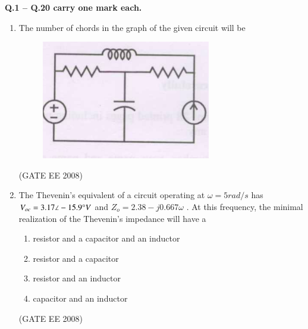\documentclass[journal,12pt,onecolumn]{IEEEtran}
\theoremstyle{remark}
\begin{document}
     \Large\textbf{Q.1 -- Q.20 carry one mark each.} \\[10mm]


\begin{enumerate}[start=1, label=Q.\arabic*]
    \item The number of chords in the graph of the given circuit will be
\begin{figure}[H]
    \centering
    \includegraphics[width=0.5\columnwidth]{Fig/q1.png}
    \label{fig:placeholder}
\end{figure}


\begin{enumerate}[label=(\Alph*)]
\end{enumerate}
\hfill (GATE EE 2008)




\item The Thevenin's equivalent of a circuit operating at $\omega=5rad/s$ has $V_{oc}=3.17 \angle - 15.9 \degree V$ and $Z_o = 2.38 - j0.667\omega$ . At this frequency, the minimal
realization of the Thevenin's impedance will have a

\begin{multicols}{2}
\begin{enumerate}[label=(\Alph*)]

\item resistor and a capacitor and an inductor
\item resistor and a capacitor
\item resistor and an inductor
\item capacitor and an inductor
\end{enumerate}
\end{multicols}
\hfill (GATE EE 2008)






\end{enumerate}
\end{document}
